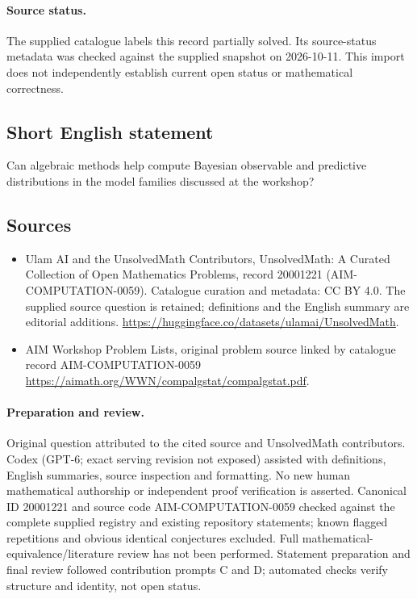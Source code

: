 \documentclass[11pt]{article}
\begin{document}
\paragraph{Source status.}
The supplied catalogue labels this record partially solved. Its source-status metadata was checked against the supplied snapshot on 2026-10-11. This import does not independently establish current open status or mathematical correctness.
\subsection{Short English statement}
Can algebraic methods help compute Bayesian observable and predictive distributions in the model families discussed at the workshop?
\subsection{Sources}
\begin{itemize}
\item[\hypertarget{source:20001221:1}{S1}] Ulam AI and the UnsolvedMath Contributors, UnsolvedMath: A Curated Collection of Open Mathematics Problems, record 20001221 (AIM-COMPUTATION-0059). Catalogue curation and metadata: CC BY 4.0. The supplied source question is retained; definitions and the English summary are editorial additions.
\url{https://huggingface.co/datasets/ulamai/UnsolvedMath}.
\item[\hypertarget{source:20001221:2}{S2}] AIM Workshop Problem Lists, original problem source linked by catalogue record AIM-COMPUTATION-0059
\url{https://aimath.org/WWN/compalgstat/compalgstat.pdf}.
\end{itemize}
\paragraph{Preparation and review.}
Original question attributed to the cited source and UnsolvedMath contributors. Codex (GPT-6; exact serving revision not exposed) assisted with definitions, English summaries, source inspection and formatting. No new human mathematical authorship or independent proof verification is asserted. Canonical ID 20001221 and source code AIM-COMPUTATION-0059 checked against the complete supplied registry and existing repository statements; known flagged repetitions and obvious identical conjectures excluded. Full mathematical-equivalence/literature review has not been performed. Statement preparation and final review followed contribution prompts C and D; automated checks verify structure and identity, not open status.
\label{end:20001221}
\end{document}
